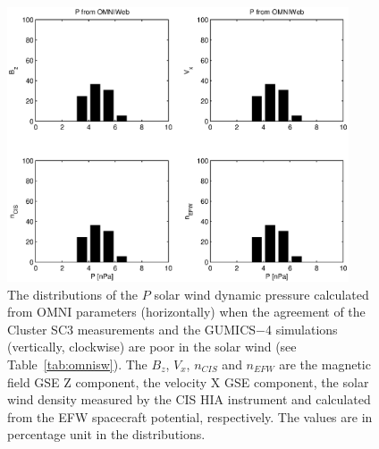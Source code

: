 \documentclass[linenumbers,draft]{agujournal}
\begin{document}
\begin{figure}[h]
\centering
\includegraphics[width=0.9\textwidth,angle=0]{swe-2020-corr-f16.eps}  
\caption{The distributions of the $P$ solar wind dynamic pressure calculated from OMNI parameters (horizontally) when the agreement of the Cluster SC3 measurements and the GUMICS$-$4 simulations (vertically, clockwise) are poor in the solar wind (see Table~\ref{tab:omnisw}). The $B_{z}$, $V_{x}$, $n_{CIS}$ and $n_{EFW}$ are the magnetic field GSE Z component, the velocity X GSE component, the solar wind density measured by the CIS HIA instrument and calculated from the EFW spacecraft potential, respectively. The values are in percentage unit in the distributions.}
\label{fig:swomnip}
\end{figure}

\pagebreak
\end{document}
